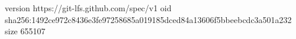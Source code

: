 version https://git-lfs.github.com/spec/v1
oid sha256:1492ce972c8436e3fe97258685a019185dced84a13606f5bbeebcdc3a501a232
size 655107
